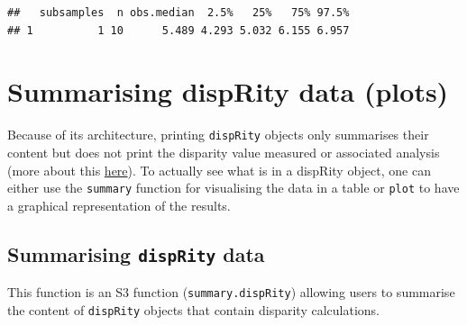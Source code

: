 \documentclass[]{book}
\theoremstyle{definition}
\theoremstyle{definition}
\theoremstyle{remark}
\begin{document}
\begin{verbatim}
##   subsamples  n obs.median  2.5%   25%   75% 97.5%
## 1          1 10      5.489 4.293 5.032 6.155 6.957
\end{verbatim}

\section{Summarising dispRity data
(plots)}\label{summarising-disprity-data-plots}

Because of its architecture, printing \texttt{dispRity} objects only
summarises their content but does not print the disparity value measured
or associated analysis (more about this
\protect\hyperlink{manipulating-dispRity-objects}{here}). To actually
see what is in a dispRity object, one can either use the
\texttt{summary} function for visualising the data in a table or
\texttt{plot} to have a graphical representation of the results.

\subsection{\texorpdfstring{Summarising \texttt{dispRity}
data}{Summarising dispRity data}}\label{summarising-disprity-data}

This function is an S3 function (\texttt{summary.dispRity}) allowing
users to summarise the content of \texttt{dispRity} objects that contain
disparity calculations.
\end{document}
